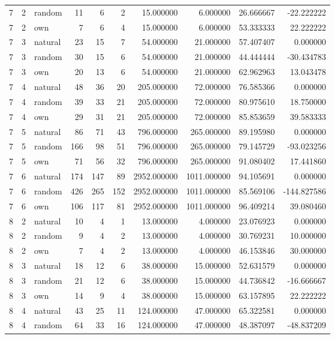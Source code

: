\begin{table}[htbp]
\begin{tabular}{rrlrrrrrrr}
7 & 2 & random & 11 & 6 & 2 & 15.000000 & 6.000000 & 26.666667 & -22.222222 \\
7 & 2 & own & 7 & 6 & 4 & 15.000000 & 6.000000 & 53.333333 & 22.222222 \\
7 & 3 & natural & 23 & 15 & 7 & 54.000000 & 21.000000 & 57.407407 & 0.000000 \\
7 & 3 & random & 30 & 15 & 6 & 54.000000 & 21.000000 & 44.444444 & -30.434783 \\
7 & 3 & own & 20 & 13 & 6 & 54.000000 & 21.000000 & 62.962963 & 13.043478 \\
7 & 4 & natural & 48 & 36 & 20 & 205.000000 & 72.000000 & 76.585366 & 0.000000 \\
7 & 4 & random & 39 & 33 & 21 & 205.000000 & 72.000000 & 80.975610 & 18.750000 \\
7 & 4 & own & 29 & 31 & 21 & 205.000000 & 72.000000 & 85.853659 & 39.583333 \\
7 & 5 & natural & 86 & 71 & 43 & 796.000000 & 265.000000 & 89.195980 & 0.000000 \\
7 & 5 & random & 166 & 98 & 51 & 796.000000 & 265.000000 & 79.145729 & -93.023256 \\
7 & 5 & own & 71 & 56 & 32 & 796.000000 & 265.000000 & 91.080402 & 17.441860 \\
7 & 6 & natural & 174 & 147 & 89 & 2952.000000 & 1011.000000 & 94.105691 & 0.000000 \\
7 & 6 & random & 426 & 265 & 152 & 2952.000000 & 1011.000000 & 85.569106 & -144.827586 \\
7 & 6 & own & 106 & 117 & 81 & 2952.000000 & 1011.000000 & 96.409214 & 39.080460 \\
8 & 2 & natural & 10 & 4 & 1 & 13.000000 & 4.000000 & 23.076923 & 0.000000 \\
8 & 2 & random & 9 & 4 & 2 & 13.000000 & 4.000000 & 30.769231 & 10.000000 \\
8 & 2 & own & 7 & 4 & 2 & 13.000000 & 4.000000 & 46.153846 & 30.000000 \\
8 & 3 & natural & 18 & 12 & 6 & 38.000000 & 15.000000 & 52.631579 & 0.000000 \\
8 & 3 & random & 21 & 12 & 6 & 38.000000 & 15.000000 & 44.736842 & -16.666667 \\
8 & 3 & own & 14 & 9 & 4 & 38.000000 & 15.000000 & 63.157895 & 22.222222 \\
8 & 4 & natural & 43 & 25 & 11 & 124.000000 & 47.000000 & 65.322581 & 0.000000 \\
8 & 4 & random & 64 & 33 & 16 & 124.000000 & 47.000000 & 48.387097 & -48.837209 \\

\end{tabular}
\end{table}
